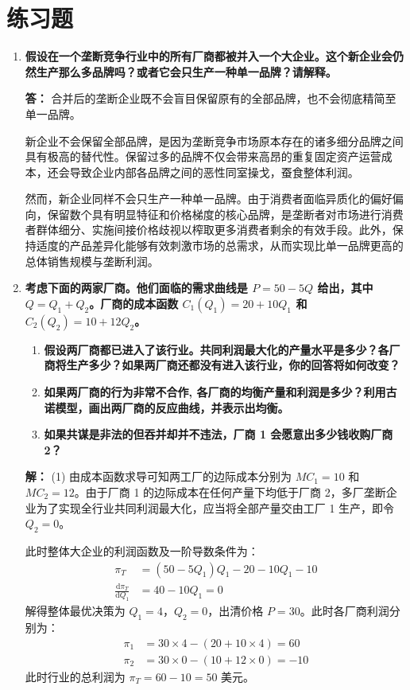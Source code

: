 	\section{练习题}
	\begin{enumerate}[label=\textbf{\arabic*.}, leftmargin=*]
		\item \textbf{假设在一个垄断竞争行业中的所有厂商都被并入一个大企业。这个新企业会仍然生产那么多品牌吗？或者它会只生产一种单一品牌？请解释。}
		
		\textbf{答：}
		合并后的垄断企业既不会盲目保留原有的全部品牌，也不会彻底精简至单一品牌。
		
		新企业不会保留全部品牌，是因为垄断竞争市场原本存在的诸多细分品牌之间具有极高的替代性。保留过多的品牌不仅会带来高昂的重复固定资产运营成本，还会导致企业内部各品牌之间的恶性同室操戈，蚕食整体利润。
		
		然而，新企业同样不会只生产一种单一品牌。由于消费者面临异质化的偏好偏向，保留数个具有明显特征和价格梯度的核心品牌，是垄断者对市场进行消费者群体细分、实施间接价格歧视以榨取更多消费者剩余的有效手段。此外，保持适度的产品差异化能够有效刺激市场的总需求，从而实现比单一品牌更高的总体销售规模与垄断利润。
		
		\item \textbf{考虑下面的两家厂商。他们面临的需求曲线是 $P = 50 - 5Q$ 给出，其中 $Q = Q_1 + Q_2$。厂商的成本函数 $C_1(Q_1) = 20 + 10Q_1$ 和 $C_2(Q_2) = 10 + 12Q_2$。}
		
		\begin{enumerate}
			\item \textbf{假设两厂商都已进入了该行业。共同利润最大化的产量水平是多少？各厂商将生产多少？如果两厂商还都没有进入该行业，你的回答将如何改变？}
			\item \textbf{如果两厂商的行为非常不合作, 各厂商的均衡产量和利润是多少？利用古诺模型，画出两厂商的反应曲线，并表示出均衡。}
			\item \textbf{如果共谋是非法的但吞并却并不违法，厂商 1 会愿意出多少钱收购厂商 2？}
		\end{enumerate}
		
		\textbf{解：}
		(1) 由成本函数求导可知两工厂的边际成本分别为 $MC_1 = 10$ 和 $MC_2 = 12$。由于厂商 1 的边际成本在任何产量下均低于厂商 2，多厂垄断企业为了实现全行业共同利润最大化，应当将全部产量交由工厂 1 生产，即令 $Q_2 = 0$。
		
		此时整体大企业的利润函数及一阶导数条件为：
		\[
		\begin{aligned}
			\pi_T &= (50 - 5Q_1)Q_1 - 20 - 10Q_1 - 10 \\
			\frac{\mathrm{d}\pi_T}{\mathrm{d}Q_1} &= 40 - 10Q_1 = 0
		\end{aligned}
		\]
		解得整体最优决策为 $Q_1 = 4$，$Q_2 = 0$，出清价格 $P = 30$。此时各厂商利润分别为：
		\[
		\begin{aligned}
			\pi_1 &= 30 \times 4 - (20 + 10 \times 4) = 60 \\
			\pi_2 &= 30 \times 0 - (10 + 12 \times 0) = -10
		\end{aligned}
		\]
		此时行业的总利润为 $\pi_T = 60 - 10 = 50$ 美元。
		

\end{enumerate}
